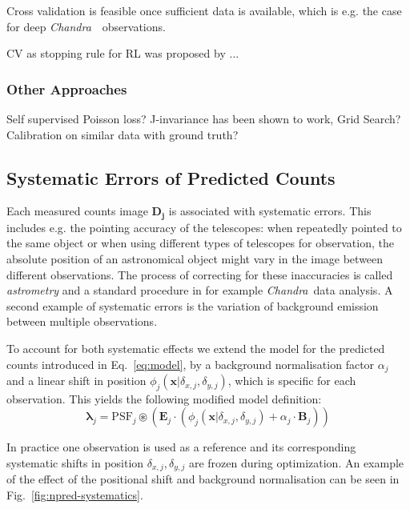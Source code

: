 \documentclass[twocolumn]{aastex631}
\newcommand{\chandra}{\textit{Chandra}~}
\begin{document}
    Cross validation is feasible once sufficient data is available, which is e.g. the 
    case for deep \chandra~observations.

    CV as stopping rule for RL was proposed by \cite{Reeves1995}...

    \subsubsection{Other Approaches}

    Self supervised Poisson loss? J-invariance has been shown to work, Grid Search? Calibration on similar data with ground truth?
    

    \subsection{Systematic Errors of Predicted Counts}
    Each measured counts image $\mathbf{D_j}$ is associated with systematic errors. This includes e.g. the pointing accuracy of the telescopes: when repeatedly pointed to the same object or when using different types of telescopes for observation, the absolute position of an astronomical object might vary in the image between different observations. The process of correcting for these inaccuracies is called \textit{astrometry} and a standard procedure in for example \chandra data analysis. A second example of systematic errors is the variation of background emission between multiple observations.
    
    To account for both systematic effects we extend the model for the predicted counts introduced in Eq.~\ref{eq:model}, by a background normalisation factor $\alpha_j$ and a linear shift in position $\phi_j(\mathbf{x}| \delta_{x,j}, \delta_{y,j})$, which is specific for each observation. This yields the following modified model definition:
    \begin{equation}
        \label{eq:model-npred-calibration}
        \mathbf{\lambda}_j = \mathrm{PSF}_j \circledast \left(\mathbf{E}_j \cdot (\phi_j(\mathbf{x}| \delta_{x,j}, \delta_{y,j}) + \alpha_j \cdot \mathbf{B}_j) \right)
    \end{equation}
    
    In practice one observation is used as a reference and its corresponding systematic shifts in position $\delta_{x,j}, \delta_{y,j}$ are frozen during optimization. An example of the effect of the positional shift and background normalisation can be seen in Fig.~\ref{fig:npred-systematics}.
\end{document}
